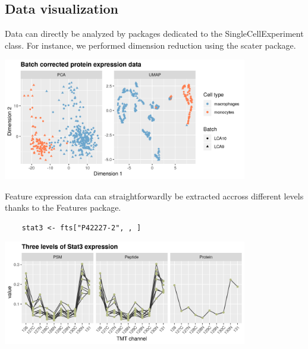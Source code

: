 \documentclass{article}
\newcommand{\hcode}[2][lgray]{{\ttfamily\color{vdgray}\colorbox{#1}{#2}}}
\begin{document}
\begin{multicols}{2}
\begin{minipage}[t]{\linewidth}
  \section*{\huge Data visualization}
  \large
  Data can directly be analyzed by packages dedicated to the \hcode{SingleCellExperiment} class. For instance, we performed dimension reduction using the \hcode{scater} package. \\
  \begin{center}
    \includegraphics[width=0.8\textwidth]{figs/dimred.png}
  \end{center}
  Feature expression data can straightforwardly be extracted accross different levels thanks to the \hcode{Features} package.
  \begin{lstlisting}
    stat3 <- fts["P42227-2", , ]
  \end{lstlisting}
  \begin{center}
  \includegraphics[width=0.8\textwidth]{figs/Stat.png}
  \end{center}
  
\end{minipage}

\noindent
\begin{minipage}[t]{\linewidth}

\end{minipage}
\end{multicols}
\end{document}
